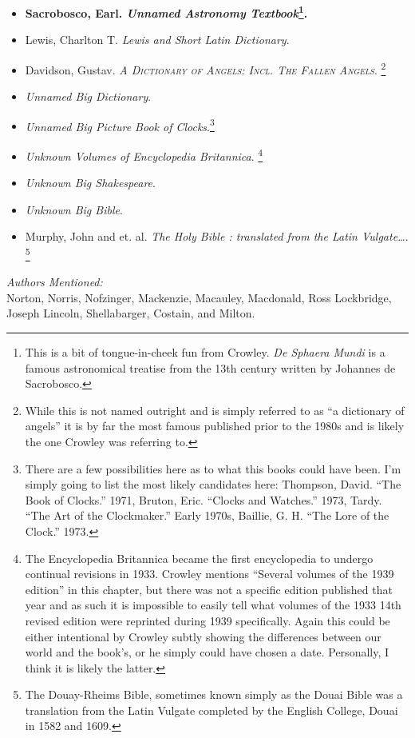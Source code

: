 \documentclass[12pt,makeidx]{extreport}
\begin{document}
\begin{itemize}
\item \textbf{Sacrobosco, Earl. \textit{Unnamed Astronomy Textbook}\footnote{This is a bit of tongue-in-cheek fun from Crowley. \textit{De Sphaera Mundi} is a famous astronomical treatise from the 13th century written by Johannes de Sacrobosco.}.} \cite{Sacrobosco}
\item Lewis, Charlton T. \textit{Lewis and Short Latin Dictionary}. \cite{Lewis1966}
\item Davidson, Gustav. \textit{\textsc{A Dictionary of Angels: Incl. The Fallen Angels}}. \cite{Davidson1967}\footnote{While this is not named outright and is simply referred to as ``a dictionary of angels'' it is by far the
most famous published prior to the 1980s and is likely the one Crowley was referring to.}
\item \textit{Unnamed Big Dictionary}.
\item \textit{Unnamed Big Picture Book of Clocks}.\footnote{There are a few possibilities here as to what this books could have been. I'm simply going to list the most likely candidates here: Thompson, David. “The Book of Clocks.” 1971, Bruton, Eric. ``Clocks and Watches.''
1973, Tardy. ``The Art of the Clockmaker.'' Early 1970s, Baillie, G. H. ``The Lore of the Clock.'' 1973.}
\item \textit{Unknown Volumes of Encyclopedia Britannica}. \footnote{The Encyclopedia Britannica became the first encyclopedia to undergo continual revisions in 1933. Crowley mentions “Several volumes of the 1939 edition” in this chapter, but there was not a specific edition published that year and as such it is impossible to easily tell what volumes of the 1933 14th revised edition were reprinted during 1939 specifically. Again this could be either intentional by Crowley subtly showing the differences between our world and the book's, or he simply could have chosen a date. Personally, I think it is likely the latter.}
\item \textit{Unknown Big Shakespeare}.
\item \textit{Unknown Big Bible}.
\item Murphy, John and et. al. \textit{The Holy Bible : translated from the Latin Vulgate\ldots}. \footnote{The Douay-Rheims Bible, sometimes known simply as the Douai Bible was a translation from the Latin Vulgate completed by the English College, Douai in 1582 and 1609.}
\end{itemize}
\textit{Authors Mentioned:}\\
Norton, Norris, Nofzinger, Mackenzie, Macauley, Macdonald, Ross Lockbridge, Joseph Lincoln, Shellabarger, Costain, and Milton.
\end{document}
